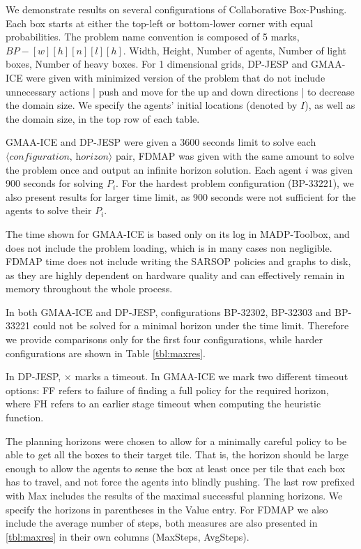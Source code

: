 \documentclass[letterpaper]{article} %
\theoremstyle{definition}
\newcommand{\cbp}[0]{Collaborative Box-Pushing}
\begin{document}
We demonstrate results on several configurations of \cbp. Each box starts at either the top-left or bottom-lower corner with equal probabilities. The problem name convention is composed of 5 marks, $\textit{BP}-[w][h][n][l][h]$.
Width, Height, Number of agents, Number of light boxes, Number of heavy boxes. For 1 dimensional grids, DP-JESP and GMAA-ICE were given with minimized version of the problem that do not include unnecessary actions | push and move for the up and down directions | to decrease the domain size. We specify the agents' initial locations (denoted by $I$), as well as the domain size, in the top row of each table.

GMAA-ICE and DP-JESP were given a 3600 seconds limit to solve each $\langle\textit{configuration, horizon}\rangle$ pair, FDMAP was given with the same amount to solve the problem once and output an infinite horizon solution. Each agent $i$ was given 900 seconds for  solving $P_i$. For the hardest problem configuration (BP-33221), we also present results for larger time limit, as 900 seconds were not sufficient for the agents to solve their $P_i$.

The time shown for GMAA-ICE is based only on its log in MADP-Toolbox, and does not include the problem loading, which is in many cases non negligible. FDMAP time does not include writing the SARSOP policies and graphs to disk, as they are highly dependent on hardware quality and can effectively remain in memory throughout the whole process.

In both GMAA-ICE and DP-JESP, configurations BP-32302, BP-32303 and BP-33221 could not be solved for a minimal horizon under the time limit. Therefore we provide comparisons only for the first four configurations, while harder configurations are shown in Table \ref{tbl:maxres}.

In DP-JESP, $\times$ marks a timeout. In GMAA-ICE we mark two different timeout options: FF refers to failure of finding a full policy for the required horizon, where FH refers to an earlier stage timeout when computing the heuristic function.

The planning horizons were chosen to allow for a minimally careful policy to be able to get all the boxes to their target tile. That is, the horizon should be large enough to allow the agents to sense the box at least once per tile that each box has to travel, and not force the agents into blindly pushing.
The last row prefixed with Max includes the results of the maximal successful planning horizons. We specify the horizons in parentheses in the Value entry. For FDMAP we also include the average number of steps, both measures are also presented in \ref{tbl:maxres} in their own columns (MaxSteps, AvgSteps).
\end{document}
